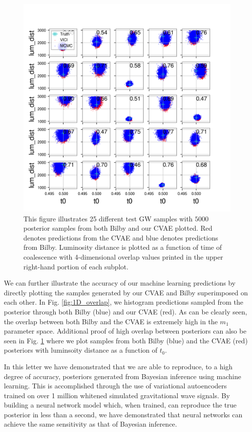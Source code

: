 \documentclass[%
showpacs,
 amsmath,amssymb,
 aps,
 twocolumn,
 prl,
 reprint,
floatfix,
]{revtex4-1}
\begin{document}
%
%
\begin{figure}
    \includegraphics[width=\columnwidth]{images/posteriors_13.png}
    \caption{\label{fig:lum_dist-t0_scatter} This figure illustrates 
    25 different test GW samples with $5000$ posterior samples 
    from both Bilby and our CVAE plotted. Red denotes predictions 
    from the CVAE and blue denotes predictions from Bilby. Luminosity 
    distance is plotted as a function of time of coalescence with 
    4-dimensional overlap values printed in the upper right-hand 
    portion of each subplot.}
\end{figure}

We can further illustrate the accuracy of our machine 
learning predictions by directly plotting the samples 
generated by our CVAE and Bilby superimposed on each other. 
In Fig. \ref{fig:1D_overlap}, we histogram predictions sampled 
from the posterior through both Bilby (blue) and our CVAE (red). 
As can be clearly seen, the overlap between both Bilby and 
the CVAE is extremely high in the $m_1$ parameter space. Additional 
proof of high overlap between posteriors can also be seen 
in Fig. \ref{fig:lum_dist-t0_scatter} where 
we plot samples from both Bilby (blue) and the CVAE (red) posteriors 
with luminsoity distance as a function of $t_0$. 

%
%
In this letter we have demonstrated that we 
are able to reproduce, to a high degree of accuracy, posteriors 
generated from Bayesian inference using machine learning. This 
is accomplished through the use of variational autoencoders 
trained on over 1 million whitened simulated gravitational 
wave signals. By building a neural network model which, 
when trained, can reproduce the true posterior in less than a 
second, we have demonstrated that neural networks 
can achieve the same sensitivity as that of Bayesian 
inference.
\end{document}
